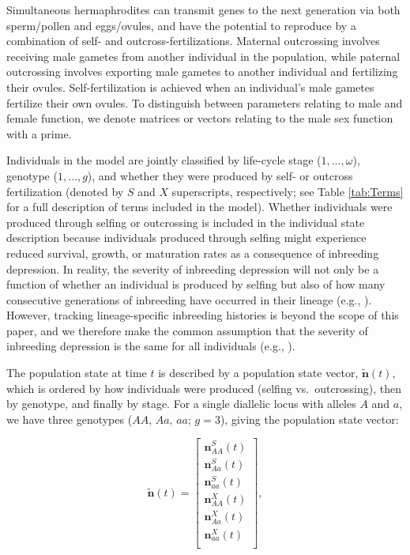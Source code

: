 \documentclass[11pt]{article}
\def\mbf#1{\mathbf{#1}}
\begin{document}
Simultaneous hermaphrodites can transmit genes to the next generation via both sperm/pollen and eggs/ovules, and have the potential to reproduce by a combination of self- and outcross-fertilizations. Maternal outcrossing involves receiving male gametes from another individual in the population, while paternal outcrossing involves exporting male gametes to another individual and fertilizing their ovules. Self-fertilization is achieved when an individual's male gametes fertilize their own ovules. To distinguish between parameters relating to male and female function, we denote matrices or vectors relating to the male sex function with a prime. 

Individuals in the model are jointly classified by life-cycle stage ($1, \ldots, \omega$), genotype ($1, \ldots, g$), and whether they were produced by self- or outcross fertilization (denoted by $S$ and $X$ superscripts, respectively; see Table \ref{tab:Terms} for a full description of terms included in the model). Whether individuals were produced through selfing or outcrossing is included in the individual state description because individuals produced through selfing might experience reduced survival, growth, or maturation rates as a consequence of inbreeding depression. In reality, the severity of inbreeding depression will not only be a function of whether an individual is produced by selfing but also of how many consecutive generations of inbreeding have occurred in their lineage (e.g., \citealt{kelly1999response, kelly2007mutation}). However, tracking lineage-specific inbreeding histories is beyond the scope of this paper, and we therefore make the common assumption that the severity of inbreeding depression is the same for all individuals (e.g., \citealt{Charlesworth1987, Charlesworth2009, Charlesworth2010,JordanConnallon2014}).

The population state at time $t$ is described by a population state vector, $\tilde{\mbf{n}}(t)$, which is ordered by how individuals were produced (selfing vs.~outcrossing), then by genotype, and finally by stage. For a single diallelic locus with alleles $A$ and $a$, we have three genotypes ($AA,\, Aa,\, aa$; $g = 3$), giving the population state vector:
\begin{linenomath*}
\begin{equation} \label{eq:PopStateVec}
	\tilde{\mbf{n}}(t) =  \left[
								\begin{array}{c}
									\mbf{n}^{S}_{AA}(t) \\
									\mbf{n}^{S}_{Aa}(t) \\
									\mbf{n}^{S}_{aa}(t) \\ \hline
									\mbf{n}^{X}_{AA}(t) \\
									\mbf{n}^{X}_{Aa}(t) \\
									\mbf{n}^{X}_{aa}(t) \\ 
						\end{array} \right],
\end{equation}
\end{linenomath*}
\end{document}

